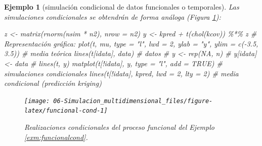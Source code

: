 \documentclass[
]{book}
\newenvironment{Shaded}{\begin{snugshade}}{\end{snugshade}}
\newcommand{\AttributeTok}[1]{\textcolor[rgb]{0.77,0.63,0.00}{#1}}
\newcommand{\CommentTok}[1]{\textcolor[rgb]{0.56,0.35,0.01}{\textit{#1}}}
\newcommand{\ConstantTok}[1]{\textcolor[rgb]{0.00,0.00,0.00}{#1}}
\newcommand{\DecValTok}[1]{\textcolor[rgb]{0.00,0.00,0.81}{#1}}
\newcommand{\FloatTok}[1]{\textcolor[rgb]{0.00,0.00,0.81}{#1}}
\newcommand{\FunctionTok}[1]{\textcolor[rgb]{0.00,0.00,0.00}{#1}}
\newcommand{\NormalTok}[1]{#1}
\newcommand{\OtherTok}[1]{\textcolor[rgb]{0.56,0.35,0.01}{#1}}
\newcommand{\SpecialCharTok}[1]{\textcolor[rgb]{0.00,0.00,0.00}{#1}}
\newcommand{\StringTok}[1]{\textcolor[rgb]{0.31,0.60,0.02}{#1}}
\theoremstyle{break}
\newtheorem{example}{Ejemplo}[chapter]
\theoremstyle{nonumberplain}
\begin{document}
\begin{example}[simulación condicional de datos funcionales o temporales]
Las simulaciones condicionales se obtendrán de forma análoga (Figura \ref{fig:funcional-cond}):



\begin{Shaded}
\begin{Highlighting}[]
\NormalTok{z }\OtherTok{\textless{}{-}} \FunctionTok{matrix}\NormalTok{(}\FunctionTok{rnorm}\NormalTok{(nsim }\SpecialCharTok{*}\NormalTok{ n2), }\AttributeTok{nrow =}\NormalTok{ n2)}
\NormalTok{y }\OtherTok{\textless{}{-}}\NormalTok{ kpred }\SpecialCharTok{+} \FunctionTok{t}\NormalTok{(}\FunctionTok{chol}\NormalTok{(kcov)) }\SpecialCharTok{\%*\%}\NormalTok{ z}
\CommentTok{\# Representación gráfica:}
\FunctionTok{plot}\NormalTok{(t, mu, }\AttributeTok{type =} \StringTok{"l"}\NormalTok{, }\AttributeTok{lwd =} \DecValTok{2}\NormalTok{, }\AttributeTok{ylab =} \StringTok{"y"}\NormalTok{, }\AttributeTok{ylim =} \FunctionTok{c}\NormalTok{(}\SpecialCharTok{{-}}\FloatTok{3.5}\NormalTok{, }\FloatTok{3.5}\NormalTok{)) }\CommentTok{\# media teórica}
\FunctionTok{lines}\NormalTok{(t[idata], data) }\CommentTok{\# datos}
\CommentTok{\# y \textless{}{-} rep(NA, n)}
\CommentTok{\# y[idata] \textless{}{-} data}
\CommentTok{\# lines(t, y)}
\FunctionTok{matplot}\NormalTok{(t[}\SpecialCharTok{!}\NormalTok{idata], y, }\AttributeTok{type =} \StringTok{"l"}\NormalTok{, }\AttributeTok{add =} \ConstantTok{TRUE}\NormalTok{) }\CommentTok{\# simulaciones condicionales}
\FunctionTok{lines}\NormalTok{(t[}\SpecialCharTok{!}\NormalTok{idata], kpred, }\AttributeTok{lwd =} \DecValTok{2}\NormalTok{, }\AttributeTok{lty =} \DecValTok{2}\NormalTok{) }\CommentTok{\# media condicional (predicción kriging)}
\end{Highlighting}
\end{Shaded}

\begin{figure}[!htb]

{\centering \texttt{[image: 06-Simulacion\_multidimensional\_files/figure-latex/funcional-cond-1]} 

}

\caption{Realizaciones condicionales del proceso funcional del Ejemplo \ref{exm:funcionalcond}.}\label{fig:funcional-cond}
\end{figure}

\end{example}
\end{document}

